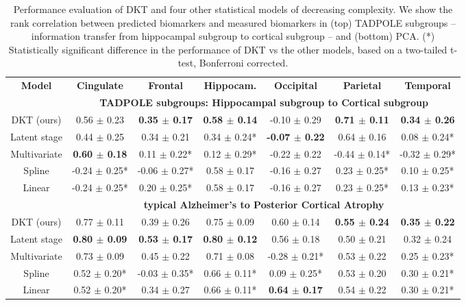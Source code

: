 \newcommand{\cw}{c}

\begin{table}
\centering
\fontsize{9}{12}\selectfont
\begin{tabular}{c | c c c c c c}
\textbf{Model} & \textbf{Cingulate} & \textbf{Frontal} & \textbf{Hippocam.} & \textbf{Occipital} & \textbf{Parietal} & \textbf{Temporal}\\
& \multicolumn{6}{c}{\textbf{TADPOLE subgroups: Hippocampal subgroup to Cortical subgroup}}\\
DKT (ours) &      0.56 $\pm$ 0.23 &    \textbf{0.35 $\pm$ 0.17} &        \textbf{0.58 $\pm$ 0.14} &     -0.10 $\pm$ 0.29 &     \textbf{0.71 $\pm$ 0.11} &     \textbf{0.34 $\pm$ 0.26} \\
Latent stage &      0.44 $\pm$ 0.25 &    0.34 $\pm$ 0.21 &       0.34 $\pm$ 0.24* &     \textbf{-0.07 $\pm$ 0.22} &     0.64 $\pm$ 0.16 &    0.08 $\pm$ 0.24* \\
Multivariate &      \textbf{0.60 $\pm$ 0.18} &   0.11 $\pm$ 0.22* &       0.12 $\pm$ 0.29* &     -0.22 $\pm$ 0.22 &   -0.44 $\pm$ 0.14* &   -0.32 $\pm$ 0.29* \\
Spline &    -0.24 $\pm$ 0.25* &  -0.06 $\pm$ 0.27* &        0.58 $\pm$ 0.17 &     -0.16 $\pm$ 0.27 &    0.23 $\pm$ 0.25* &    0.10 $\pm$ 0.25* \\
Linear &    -0.24 $\pm$ 0.25* &   0.20 $\pm$ 0.25* &        0.58 $\pm$ 0.17 &     -0.16 $\pm$ 0.27 &    0.23 $\pm$ 0.25* &    0.13 $\pm$ 0.23* \\
& \multicolumn{6}{c}{\textbf{typical Alzheimer's to Posterior Cortical Atrophy}}\\
DKT (ours) &    0.77 $\pm$ 0.11 &    0.39 $\pm$ 0.26 &      0.75 $\pm$ 0.09 &    0.60 $\pm$ 0.14 &    \textbf{0.55 $\pm$ 0.24} &    \textbf{0.35 $\pm$ 0.22} \\
Latent stage &    \textbf{0.80 $\pm$ 0.09} &    \textbf{0.53 $\pm$ 0.17} &      \textbf{0.80 $\pm$ 0.12} &    0.56 $\pm$ 0.18 &    0.50 $\pm$ 0.21 &    0.32 $\pm$ 0.24 \\
Multivariate &   0.73 $\pm$ 0.09 &   0.45 $\pm$ 0.22  &    0.71 $\pm$ 0.08 & -0.28 $\pm$ 0.21* &  0.53 $\pm$ 0.22  &  0.25 $\pm$ 0.23* \\
Spline &   0.52 $\pm$ 0.20* &  -0.03 $\pm$ 0.35* &     0.66 $\pm$ 0.11* &   0.09 $\pm$ 0.25* &    0.53 $\pm$ 0.20 &   0.30 $\pm$ 0.21* \\
Linear &   0.52 $\pm$ 0.20* &    0.34 $\pm$ 0.27 &     0.66 $\pm$ 0.11* &    \textbf{0.64 $\pm$ 0.17} &    0.54 $\pm$ 0.22 &   0.30 $\pm$ 0.21* \\
\end{tabular}
\vspace{0.5em}
\caption[Performance evaluation of DKT and other models]{Performance evaluation of DKT and four other statistical models of decreasing complexity. We show the rank correlation between predicted biomarkers and measured biomarkers in (top) TADPOLE subgroups -- information transfer from hippocampal subgroup to cortical subgroup -- and (bottom) PCA. (*) Statistically significant difference in the performance of DKT vs the other models, based on a two-tailed t-test, Bonferroni corrected.}
\label{sec:dktPerfMetrics}
\end{table}
